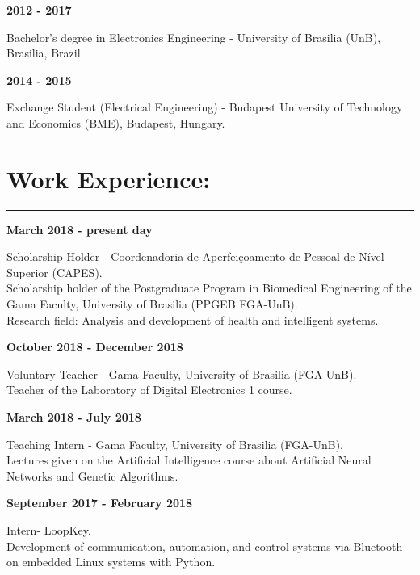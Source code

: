 \documentclass[11pt]{article}
\begin{document}
\textbf{2012 - 2017}
\begin{addmargin}{0.5cm}
Bachelor's degree in Electronics Engineering - University of Brasilia (UnB), Brasilia, Brazil. \\
\end{addmargin}

\textbf{2014 - 2015}
\begin{addmargin}{0.5cm}
Exchange Student (Electrical Engineering) - Budapest University of Technology and Economics (BME), Budapest, Hungary.
\end{addmargin}

\section{Work Experience:}
\hrule \vspace{0.1cm}

\textbf{March 2018 - present day}
\begin{addmargin}{0.5cm}
Scholarship Holder - Coordenadoria de Aperfeiçoamento de Pessoal de Nível Superior (CAPES). \\
Scholarship holder of the Postgraduate Program in Biomedical Engineering of the
Gama Faculty, University of Brasilia (PPGEB FGA-UnB).\\
Research field: Analysis and development of health and intelligent systems.\\
\end{addmargin}

\textbf{October 2018 - December 2018}
\begin{addmargin}{0.5cm}
Voluntary Teacher -  Gama Faculty, University of Brasilia (FGA-UnB).\\
Teacher of the Laboratory of Digital Electronics 1 course. \\
\end{addmargin}

\newpage
\textbf{March 2018 - July 2018}
\begin{addmargin}{0.5cm}
Teaching Intern - Gama Faculty, University of Brasilia (FGA-UnB).\\
Lectures given on the Artificial Intelligence  course  about Artificial Neural Networks
and Genetic Algorithms. \\
\end{addmargin}

\textbf{September 2017 - February 2018}
\begin{addmargin}{0.5cm}
Intern- LoopKey.\\
Development of communication, automation, and control systems via Bluetooth on
embedded Linux systems with Python. \\
\end{addmargin}
\end{document}
